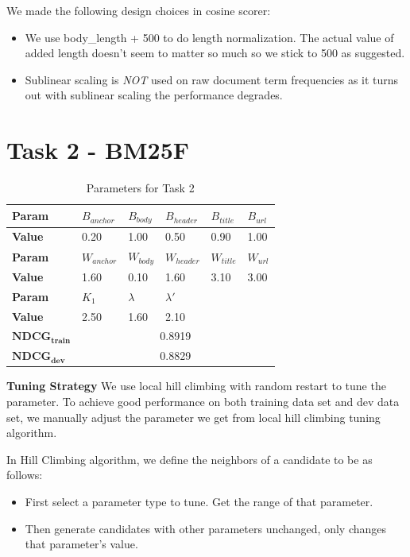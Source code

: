 \documentclass{article}
\begin{document}
We made the following design choices in cosine scorer:

\begin{itemize}
    \item We use body\_length + 500 to do length normalization. The actual value of added length doesn't seem to matter so much so we stick to 500 as suggested.
    \item Sublinear scaling is \emph{NOT} used on raw document term frequencies as it turns out with sublinear scaling the performance degrades.
\end{itemize}

\section{Task 2 - BM25F}

\begin{table}[!htb]
  \centering
  \begin{tabular}{ | l | l | l | l | l | l |}
    \hline
    \textbf{Param} & $B_{anchor}$ & $B_{body}$ & $B_{header}$ & $B_{title}$ & $B_{url}$ \\
    \hline
    \textbf{Value} & 0.20 & 1.00 & 0.50 & 0.90 & 1.00 \\
    \hline
    \textbf{Param} & $W_{anchor}$ & $W_{body}$ & $W_{header}$ & $W_{title}$ & $W_{url}$ \\
    \hline
    \textbf{Value} & 1.60 & 0.10 & 1.60 & 3.10 & 3.00 \\
    \hline
    \textbf{Param} & $K_1$ & $\lambda$ & $\lambda'$ & \multicolumn{2}{c|}{} \\
    \hline
    \textbf{Value} & 2.50 & 1.60 & 2.10 & \multicolumn{2}{c|}{}\\
    \hline
    $\mathbf{NDCG_{train}}$ & \multicolumn{5}{c|}{0.8919} \\
    \hline
    $\mathbf{NDCG_{dev}}$ & \multicolumn{5}{c|}{0.8829} \\
    \hline
  \end{tabular}
  \caption{Parameters for Task 2}
\end{table}

\textbf{Tuning Strategy} We use local hill climbing with random restart to tune the parameter. To achieve good performance on both training data set and dev data set, we manually adjust the parameter we get from local hill climbing tuning algorithm.

In Hill Climbing algorithm, we define the neighbors of a candidate to be as follows:
\begin{itemize}
  \item First select a parameter type to tune. Get the range of that parameter.
  \item Then generate candidates with other parameters unchanged, only changes that parameter's value.
\end{itemize}
\end{document}
